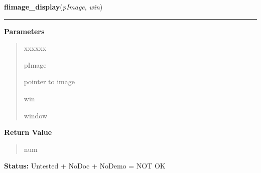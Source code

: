 \hspace{.8\funcindent}\begin{boxedminipage}{\funcwidth}

    \raggedright \textbf{flimage\_display}(\textit{pImage}, \textit{win})

    \vspace{-1.5ex}

    \rule{\textwidth}{0.5\fboxrule}
\setlength{\parskip}{2ex}
\setlength{\parskip}{1ex}
      \textbf{Parameters}
      \vspace{-1ex}

      \begin{quote}
        \begin{Ventry}{xxxxxx}

          \item[pImage]

          pointer to image

          \item[win]

          window

        \end{Ventry}

      \end{quote}

      \textbf{Return Value}
    \vspace{-1ex}

      \begin{quote}
      num

      \end{quote}

\textbf{Status:} Untested + NoDoc + NoDemo = NOT OK



    \end{boxedminipage}

    \label{xformslib:library:flimage_sdisplay}

    \vspace{0.5ex}

